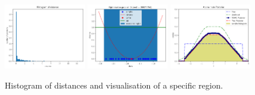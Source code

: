 \begin{figure}[h]
  \begin{center}
    \includegraphics[width=0.32\textwidth]{./latex_files/images/chapter3/example_theta_dist.png}
    \includegraphics[width=0.32\textwidth]{./latex_files/images/chapter3/example_region_samples.png}
    \includegraphics[width=0.32\textwidth]{./latex_files/images/chapter3/example_posterior.png}

    \end{center}
    \caption[Histogram of distances at the 1D example.]{Histogram of
      distances and visualisation of a specific region.}
    \label{fig:example_training_hist}
\end{figure}

